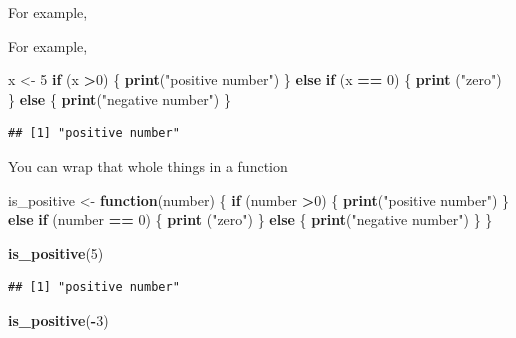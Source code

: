 \documentclass[
]{book}
\newenvironment{Shaded}{\begin{snugshade}}{\end{snugshade}}
\newcommand{\ControlFlowTok}[1]{\textcolor[rgb]{0.13,0.29,0.53}{\textbf{#1}}}
\newcommand{\DecValTok}[1]{\textcolor[rgb]{0.00,0.00,0.81}{#1}}
\newcommand{\KeywordTok}[1]{\textcolor[rgb]{0.13,0.29,0.53}{\textbf{#1}}}
\newcommand{\NormalTok}[1]{#1}
\newcommand{\OperatorTok}[1]{\textcolor[rgb]{0.81,0.36,0.00}{\textbf{#1}}}
\newcommand{\StringTok}[1]{\textcolor[rgb]{0.31,0.60,0.02}{#1}}
\theoremstyle{definition}
\theoremstyle{definition}
\theoremstyle{definition}
\theoremstyle{remark}
\begin{document}
For example,

For example,

\begin{Shaded}
\begin{Highlighting}[]
\NormalTok{x <{-}}\StringTok{ }\DecValTok{5}
\ControlFlowTok{if}\NormalTok{ (x }\OperatorTok{>}\DecValTok{0}\NormalTok{) \{}
  \KeywordTok{print}\NormalTok{(}\StringTok{"positive number"}\NormalTok{)}
\NormalTok{\} }\ControlFlowTok{else} \ControlFlowTok{if}\NormalTok{ (x }\OperatorTok{==}\StringTok{ }\DecValTok{0}\NormalTok{)  \{}
  \KeywordTok{print}\NormalTok{ (}\StringTok{"zero"}\NormalTok{)}
\NormalTok{\} }\ControlFlowTok{else}\NormalTok{ \{}
  \KeywordTok{print}\NormalTok{(}\StringTok{"negative number"}\NormalTok{)}
\NormalTok{\}}
\end{Highlighting}
\end{Shaded}

\begin{verbatim}
## [1] "positive number"
\end{verbatim}

You can wrap that whole things in a function

\begin{Shaded}
\begin{Highlighting}[]
\NormalTok{is\_positive <{-}}\StringTok{ }\ControlFlowTok{function}\NormalTok{(number) \{}
  \ControlFlowTok{if}\NormalTok{ (number }\OperatorTok{>}\DecValTok{0}\NormalTok{) \{}
    \KeywordTok{print}\NormalTok{(}\StringTok{"positive number"}\NormalTok{)}
\NormalTok{  \} }\ControlFlowTok{else} \ControlFlowTok{if}\NormalTok{ (number }\OperatorTok{==}\StringTok{ }\DecValTok{0}\NormalTok{)  \{}
    \KeywordTok{print}\NormalTok{ (}\StringTok{"zero"}\NormalTok{)}
\NormalTok{  \} }\ControlFlowTok{else}\NormalTok{ \{}
    \KeywordTok{print}\NormalTok{(}\StringTok{"negative number"}\NormalTok{)}
\NormalTok{  \}}
\NormalTok{\}}

\KeywordTok{is\_positive}\NormalTok{(}\DecValTok{5}\NormalTok{)}
\end{Highlighting}
\end{Shaded}

\begin{verbatim}
## [1] "positive number"
\end{verbatim}

\begin{Shaded}
\begin{Highlighting}[]
\KeywordTok{is\_positive}\NormalTok{(}\OperatorTok{{-}}\DecValTok{3}\NormalTok{)}
\end{Highlighting}
\end{Shaded}
\end{document}
